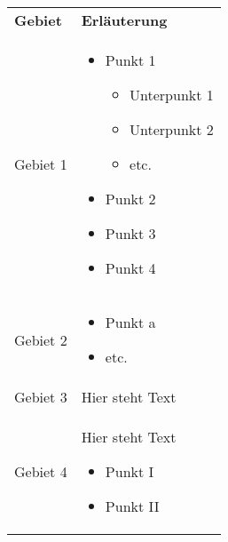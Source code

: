 \documentclass[ngerman]{scrartcl}
\begin{document}
    \begin{tabular}{@{}lP{6cm}@{}}
      \textbf{Gebiet} & \textbf{Erläuterung} \\[5pt]
      Gebiet 1 &
        \begin{itemize}
          \item Punkt 1 
          \begin{itemize}
            \item Unterpunkt 1
            \item Unterpunkt 2
            \item etc.
          \end{itemize}
          \item Punkt 2
          \item Punkt 3
          \item Punkt 4
        \end{itemize}\\
      Gebiet 2  & 
        \begin{itemize}
          \item Punkt a
          \item etc.
        \end{itemize}\\
      Gebiet 3 & 
        Hier steht Text\\
      Gebiet 4 & 
        Hier steht Text
        \begin{itemize}
          \item Punkt I
          \item Punkt II
        \end{itemize}
    \end{tabular}
\end{document}
